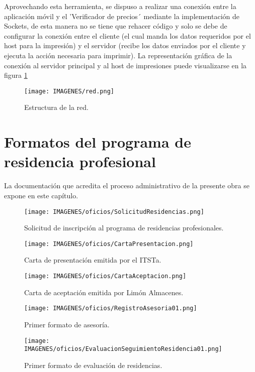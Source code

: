 Aprovechando esta herramienta, se dispuso a realizar una conexión entre la aplicación móvil y el 'Verificador de precios´ mediante la implementación de Sockets, de esta manera no se tiene que rehacer código y solo se debe de configurar la conexión entre el cliente (el cual manda los datos requeridos por el host para la impresión) y el servidor (recibe los datos enviados por el cliente y ejecuta la acción necesaria para imprimir). La representación gráfica de la conexión al servidor principal y al host de impresiones puede visualizarse en la figura \ref{red}

\begin{figure}[!h]
	\centering
	\texttt{[image: IMAGENES/red.png]}
	\caption{Estructura de la red.}
	\label{red}
\end{figure}

\newpage
\section{Formatos del programa de residencia profesional}
La documentación que acredita el proceso administrativo de la presente obra se expone en este capítulo.

\begin{figure}[!h]
	\centering
	\texttt{[image: IMAGENES/oficios/SolicitudResidencias.png]}
	\caption{Solicitud de inscripción al programa de residencias profesionales.}
	\label{oficio_solicitud}
\end{figure}

\begin{figure}[h]
	\centering
	\texttt{[image: IMAGENES/oficios/CartaPresentacion.png]}
	\caption{Carta de presentación emitida por el ITSTa.}
	\label{oficio_cartapresentacion}
\end{figure}

\begin{figure}[h]
	\centering
	\texttt{[image: IMAGENES/oficios/CartaAceptacion.png]}
	\caption{Carta de aceptación emitida por Limón Almacenes.}
	\label{oficio_cartaaceptacion}
\end{figure}

\begin{figure}[h]
	\centering
	\texttt{[image: IMAGENES/oficios/RegistroAsesoria01.png]}
	\caption{Primer formato de asesoría.}
	\label{oficio_asesoria1}
\end{figure}

\begin{figure}[h]
	\centering
	\texttt{[image: IMAGENES/oficios/EvaluacionSeguimientoResidencia01.png]}
	\caption{Primer formato de evaluación de residencias.}
	\label{oficio_evaluacion1}
\end{figure}

